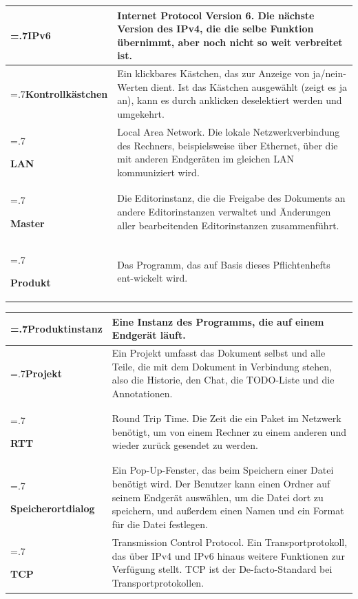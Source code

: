 \documentclass{scrartcl}
\begin{document}
\begin{tabularx}{\linewidth}{
    >{\hsize=.7\hsize}X|%
    >{\hsize=1.3\hsize}X%
  }
\textbf{IPv6} & Internet Protocol Version 6. Die nächste Version des IPv4, die die selbe Funktion übernimmt, aber noch nicht so weit verbreitet ist. \\ \hline

\textbf{Kontrollkästchen} & Ein klickbares Kästchen, das zur Anzeige von ja/nein-Werten dient. Ist das Kästchen ausgewählt (zeigt es ja an), kann es durch anklicken deselektiert werden und umgekehrt. \\ \hline

\textbf{LAN} & Local Area Network. Die lokale Netzwerkverbindung des Rechners, beispielsweise über Ethernet, über die mit anderen Endgeräten im gleichen LAN kommuniziert wird. \\ \hline

\textbf{Master} & Die Editorinstanz, die die Freigabe des Dokuments an andere Editorinstanzen verwaltet und Änderungen aller bearbeitenden Editorinstanzen zusammenführt. \\ \hline

\textbf{Produkt} & Das Programm, das auf Basis dieses Pflichtenhefts ent-wickelt wird. \\

\end{tabularx}

  \begin{tabularx}{\linewidth}{
    >{\hsize=.7\hsize}X|%
    >{\hsize=1.3\hsize}X%
  }
\hline

\textbf{Produktinstanz} & Eine Instanz des Programms, die auf einem Endgerät läuft. \\ \hline

\textbf{Projekt} & Ein Projekt umfasst das Dokument selbst und alle Teile, die mit dem Dokument in Verbindung stehen, also die Historie, den Chat, die TODO-Liste und die Annotationen. \\ \hline

\textbf{RTT} & Round Trip Time. Die Zeit die ein Paket im Netzwerk benötigt, um von einem Rechner zu einem anderen und wieder zurück gesendet zu werden. \\ \hline

\textbf{Speicherortdialog} & Ein Pop-Up-Fenster, das beim Speichern einer Datei benötigt wird. Der Benutzer kann einen Ordner auf seinem Endgerät auswählen, um die Datei dort zu speichern, und außerdem einen Namen und ein Format für die Datei festlegen. \\ \hline

\textbf{TCP} & Transmission Control Protocol. Ein Transportprotokoll, das über IPv4 und IPv6 hinaus weitere Funktionen zur Verfügung stellt. TCP ist der De-facto-Standard bei Transportprotokollen. \\ \hline

\end{tabularx}
\end{document}

